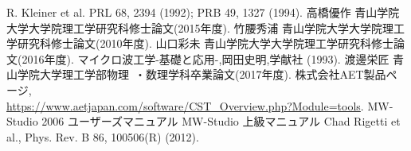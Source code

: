 \begin{thebibliography}{12}
   R. Kleiner et al. PRL 68, 2394 (1992); PRB 49, 1327 (1994).
   高橋優作 青山学院大学大学院理工学研究科修士論文(2015年度).
   竹腰秀浦 青山学院大学大学院理工学研究科修士論文(2010年度).
   山口彩未 青山学院大学大学院理工学研究科修士論文(2016年度).
   マイクロ波工学-基礎と応用-,岡田史明,学献社 (1993).
   渡邊栄匠 青山学院大学理工学部物理 ・数理学科卒業論文(2017年度).
   株式会社AET製品ページ,\\ \url{https://www.aetjapan.com/software/CST_Overview.php?Module=tools}.
   MW-Studio 2006 ユーザーズマニュアル
   MW-Studio 上級マニュアル
   Chad Rigetti et al., Phys. Rev. B 86, 100506(R) (2012).
\end{thebibliography}
